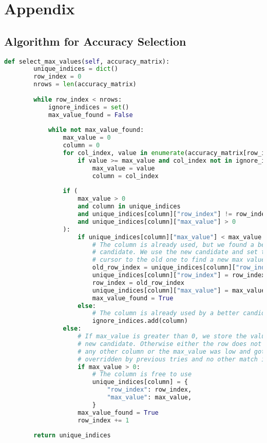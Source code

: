 \section{Appendix}

\subsection{Algorithm for Accuracy Selection}

\begin{lstlisting}[language=Python, caption=Select relevant accuracy values from a accuracy matrix., label={lst:select_max_values}]
    def select_max_values(self, accuracy_matrix):
        unique_indices = dict()
        row_index = 0
        nrows = len(accuracy_matrix)
        
        while row_index < nrows:
            ignore_indices = set()
            max_value_found = False
    
            while not max_value_found:
                max_value = 0
                column = 0
                for col_index, value in enumerate(accuracy_matrix[row_index]):
                    if value >= max_value and col_index not in ignore_indices:
                        max_value = value
                        column = col_index
    
                if (
                    max_value > 0
                    and column in unique_indices
                    and unique_indices[column]["row_index"] != row_index
                    and unique_indices[column]["max_value"] > 0
                ):
                    if unique_indices[column]["max_value"] < max_value:
                        # The column is already used, but we found a better 
                        # candidate. We use the new candidate and set the 
                        # cursor to the old one to find a new max value.
                        old_row_index = unique_indices[column]["row_index"]
                        unique_indices[column]["row_index"] = row_index
                        row_index = old_row_index
                        unique_indices[column]["max_value"] = max_value
                        max_value_found = True
                    else:
                        # The column is already used by a better candidate.
                        ignore_indices.add(column)
                else:
                    # If max_value is greater than 0, we store the value as a 
                    # new candidate. Otherwise either the row does not match 
                    # any other column or the max_value was low and got 
                    # overridden by previous tries and no other match is available. 
                    if max_value > 0:
                        # The column is free to use
                        unique_indices[column] = {
                            "row_index": row_index,
                            "max_value": max_value,
                        }
                    max_value_found = True
                    row_index += 1
        
        return unique_indices
\end{lstlisting}

